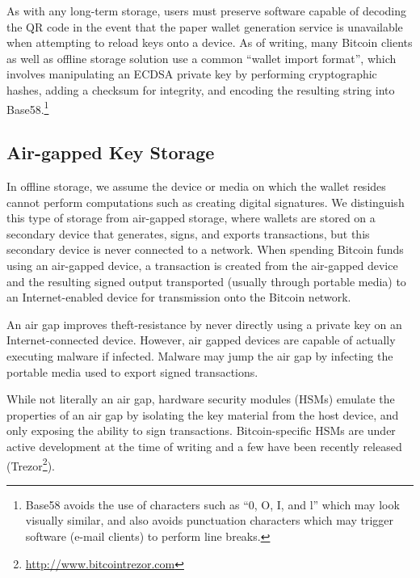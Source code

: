 
As with any long-term storage, users must preserve software capable of decoding the QR code in the event that the paper wallet generation service is unavailable when attempting to reload keys onto a device. As of writing, many Bitcoin clients as well as offline storage solution use a common ``wallet import format'', which involves manipulating an ECDSA private key by performing cryptographic hashes, adding a checksum for integrity, and encoding the resulting string into Base58.\footnote{Base58 avoids the use of characters such as ``0, O, I, and l'' which may look visually similar, and also avoids punctuation characters which may trigger software (\eg e-mail clients) to perform line breaks.}

\subsection{Air-gapped Key Storage}
In offline storage, we assume the device or media on which the wallet resides cannot perform computations such as creating digital signatures. We distinguish this type of storage from air-gapped storage, where wallets are stored on a secondary device that generates, signs, and exports transactions, but this secondary device is never connected to a network. When spending Bitcoin funds using an air-gapped device, a transaction is created from the air-gapped device and the resulting signed output transported (usually through portable media) to an Internet-enabled device for transmission onto the Bitcoin network. 

An air gap improves theft-resistance by never directly using a private key on an Internet-connected device. However, air gapped devices are capable of actually executing malware if infected. Malware may jump the air gap by infecting the portable media used to export signed transactions.

While not literally an air gap, hardware security modules (HSMs) emulate the properties of an air gap by isolating the key material from the host device, and only exposing the ability to sign transactions. Bitcoin-specific HSMs are under active development at the time of writing and a few have been recently released (\eg Trezor\footnote{\url{http://www.bitcointrezor.com}}).

